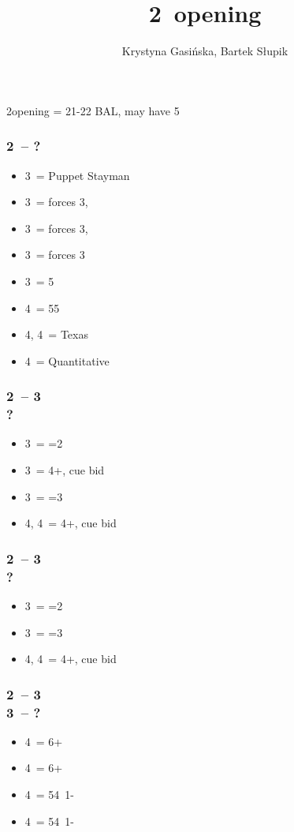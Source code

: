 \documentclass[12pt, a4paper]{article}
\title{2\ntx\ opening}
\author{Krystyna Gasińska, Bartek Słupik}
\begin{document}
\maketitle


2\nt\alrts opening = 21-22 BAL, may have 5\majs

\subsubsection*{2\ntx\ -- ?}
\begin{itemize}
    \item 3\clubs\ = Puppet Stayman
    \item 3\diams\ = forces 3\hearts, \gf
    \item 3\hearts\ = forces 3\spades, \gf
    \item 3\spades\ = forces 3\nt
    \item 3\nt\ = 5\hearts
    \item 4\clubs\ = 55 \majs
    \item 4\diams, 4\hearts\ = Texas
    \item 4\nt\ = Quantitative
\end{itemize}

\subsubsection*{2\ntx\ -- 3\diams \\ ?}
\begin{itemize}
    \item 3\hearts\ = =2\hearts
    \item 3\spades\ = 4+\hearts, cue bid
    \item 3\nt\ = =3\spades
    \item 4\clubs, 4\diams\ = 4+\hearts, cue bid
\end{itemize}

\subsubsection*{2\ntx\ -- 3\hearts \\ ?}
\begin{itemize}
    \item 3\spades\ = =2\spades
    \item 3\nt\ = =3\spades
    \item 4\clubs, 4\diams\ = 4+\spades, cue bid
\end{itemize}

\subsubsection*{2\ntx\ -- 3\spades \\ 3\nt\ -- ?}
\begin{itemize}
    \item 4\clubs\ = 6+\clubs
    \item 4\diams\ = 6+\diams
    \item 4\hearts\ = 54\minor\ 1-\hearts
    \item 4\spades\ = 54\minor\ 1-\spades
\end{itemize}

\end{document}
